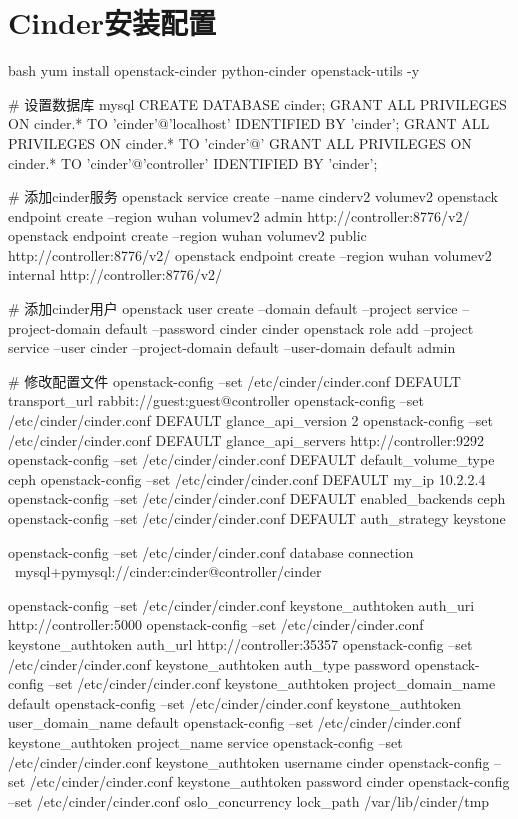 \section{Cinder安装配置}
\begin{code-block}{bash}
yum install openstack-cinder python-cinder openstack-utils -y

# 设置数据库
mysql
CREATE DATABASE cinder;
GRANT ALL PRIVILEGES ON cinder.* TO 'cinder'@'localhost' IDENTIFIED BY 'cinder';
GRANT ALL PRIVILEGES ON cinder.* TO 'cinder'@'%
GRANT ALL PRIVILEGES ON cinder.* TO 'cinder'@'controller' IDENTIFIED BY 'cinder';

# 添加cinder服务
openstack service create --name cinderv2 volumev2
openstack endpoint create --region wuhan   volumev2 admin http://controller:8776/v2/%
openstack endpoint create --region wuhan   volumev2 public http://controller:8776/v2/%
openstack endpoint create --region wuhan   volumev2 internal http://controller:8776/v2/%

# 添加cinder用户
openstack user create --domain default --project service --project-domain default --password cinder cinder
openstack role add --project service --user cinder --project-domain default --user-domain default admin

# 修改配置文件
openstack-config --set /etc/cinder/cinder.conf DEFAULT transport_url rabbit://guest:guest@controller
openstack-config --set /etc/cinder/cinder.conf DEFAULT glance_api_version 2
openstack-config --set /etc/cinder/cinder.conf DEFAULT glance_api_servers http://controller:9292
openstack-config --set /etc/cinder/cinder.conf DEFAULT default_volume_type ceph
openstack-config --set /etc/cinder/cinder.conf DEFAULT my_ip 10.2.2.4
openstack-config --set /etc/cinder/cinder.conf DEFAULT enabled_backends ceph
openstack-config --set /etc/cinder/cinder.conf DEFAULT auth_strategy keystone

openstack-config --set /etc/cinder/cinder.conf database connection \
    mysql+pymysql://cinder:cinder@controller/cinder

openstack-config --set /etc/cinder/cinder.conf keystone_authtoken auth_uri http://controller:5000
openstack-config --set /etc/cinder/cinder.conf keystone_authtoken auth_url http://controller:35357
openstack-config --set /etc/cinder/cinder.conf keystone_authtoken auth_type password
openstack-config --set /etc/cinder/cinder.conf keystone_authtoken project_domain_name default
openstack-config --set /etc/cinder/cinder.conf keystone_authtoken user_domain_name default
openstack-config --set /etc/cinder/cinder.conf keystone_authtoken project_name service
openstack-config --set /etc/cinder/cinder.conf keystone_authtoken username cinder
openstack-config --set /etc/cinder/cinder.conf keystone_authtoken password cinder
openstack-config --set /etc/cinder/cinder.conf oslo_concurrency lock_path /var/lib/cinder/tmp


\end{code-block}
